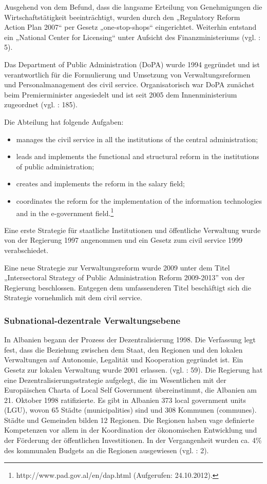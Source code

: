 Ausgehend von dem Befund, dass die langsame Erteilung von Genehmigungen die Wirtschaftstätigkeit beeinträchtigt, wurden durch den „Regulatory Reform Action Plan 2007“ per Gesetz „one-stop-shops“ eingerichtet. Weiterhin entstand ein „National Center for Licensing“ unter Aufsicht des Finanzministeriums (vgl. \cite{oecd08a} : 5).\par
Das Department of Public Administration (DoPA) wurde 1994 gegründet und ist verantwortlich für die Formulierung und Umsetzung von Verwaltungsreformen und Personalmanagement des civil service. Organisatorisch war DoPA zunächst beim Premierminister angesiedelt und ist seit 2005 dem Innenministerium zugeordnet (vgl. \cite{selenica} : 185).\par
Die Abteilung hat folgende Aufgaben:
\begin{itemize} \itemsep1pt \parskip0pt 
\item manages the civil service in all the institutions of the central administration;
\item leads and implements the functional and structural reform in the institutions of public administration;
\item creates and implements the reform in the salary field;
\item coordinates the reform for the implementation of the information technologies and in the e-government field.\footnote{http://www.pad.gov.al/en/dap.html (Aufgerufen: 24.10.2012).}
\end{itemize}
Eine erste Strategie für staatliche Institutionen und öffentliche Verwaltung wurde von der Regierung 1997 angenommen und ein Gesetz zum civil service 1999 verabschiedet.\par
Eine neue Strategie zur Verwaltungsreform wurde 2009 unter dem Titel „Intersectoral Strategy of Public Administration Reform 2009-2013” von der Regierung beschlossen. Entgegen dem umfassenderen Titel beschäftigt sich die Strategie vornehmlich mit dem civil service. 

\subsubsection{Subnational-dezentrale Verwaltungsebene }
In Albanien begann der Prozess der Dezentralisierung 1998. Die Verfassung legt fest, dass die Beziehung zwischen dem Staat, den Regionen und den lokalen Verwaltungen auf Autonomie, Legalität und Kooperation gegründet ist. Ein Gesetz zur lokalen Verwaltung wurde 2001 erlassen. (vgl. \cite{refworld10} : 59). Die Regierung hat eine Dezentralisierungsstrategie aufgelegt, die im Wesentlichen mit der Europäischen Charta of Local Self Government übereinstimmt, die Albanien am 21. Oktober 1998 ratifizierte. Es gibt in Albanien 373 local government units (LGU), wovon 65 Städte (municipalities) sind und 308 Kommunen (communes). Städte und Gemeinden bilden 12 Regionen. Die Regionen haben vage definierte Kompetenzen vor allem in der Koordination der ökonomischen Entwicklung und der Förderung der öffentlichen Investitionen. In der Vergangenheit wurden ca. 4\% des kommunalen Budgets an die Regionen ausgewiesen (vgl. \cite{oecd08a} : 2). \par

